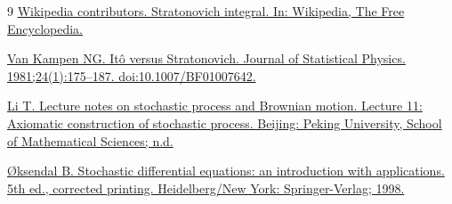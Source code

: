 \documentclass[12pt]{article}
\theoremstyle{definition}
\theoremstyle{plain}
\theoremstyle{remark}
\begin{document}
\begin{thebibliography}{9}
 \href{https://en.wikipedia.org/wiki/Stratonovich_integral}{Wikipedia contributors. Stratonovich integral. In: Wikipedia, The Free Encyclopedia.}

 \href{https://ui.adsabs.harvard.edu/abs/1981JSP....24..175V/abstract}{Van Kampen NG. Itô versus Stratonovich. Journal of Statistical Physics. 1981;24(1):175–187. doi:10.1007/BF01007642.}

 \href{https://math.pku.edu.cn/teachers/litj/notes/appl_stoch/lect11.pdf}{Li T. Lecture notes on stochastic process and Brownian motion. Lecture 11: Axiomatic construction of stochastic process. Beijing: Peking University, School of Mathematical Sciences; n.d.}

 \href{http://www.stat.ucla.edu/~ywu/research/documents/StochasticDifferentialEquations.pdf}{Øksendal B. Stochastic differential equations: an introduction with applications. 5th ed., corrected printing. Heidelberg/New York: Springer-Verlag; 1998.}

\end{thebibliography}
\end{document}
